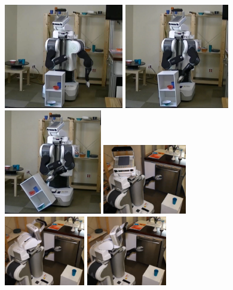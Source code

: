 \begin{figure}[!h]
  \centering
  \includegraphics[height=1.8in]{figs/8/fail1.png}
  \includegraphics[height=1.8in]{figs/8/fail2.png}
  \includegraphics[height=1.8in]{figs/8/fail3.png}
  \includegraphics[height=1.2in]{figs/8/succ1.png}
  \includegraphics[height=1.2in]{figs/8/succ2.png}
  \includegraphics[height=1.2in]{figs/8/succ3.png}

\end{figure}
